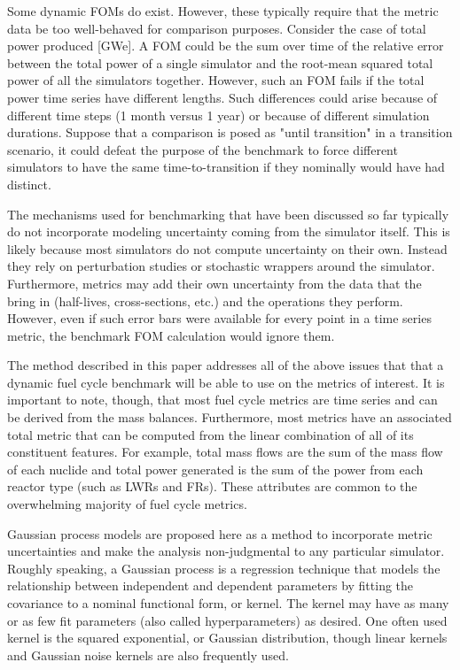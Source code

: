 Some dynamic FOMs do exist. However, these typically require that the metric
data be too well-behaved for comparison purposes. Consider the case of total
power produced [GWe]. A FOM could be the sum over time of the relative error 
between the total power of a single simulator and the root-mean squared total power
of all the simulators together. However, such an FOM fails if the total power
time series have different lengths. Such differences could arise because 
of different time steps (1 month versus 1 year) or because of different 
simulation durations. Suppose that a comparison is posed as "until transition"
in a transition scenario, it could defeat the purpose of the benchmark to
force different simulators to have the same time-to-transition if they 
nominally would have had distinct. 
 
The mechanisms used for benchmarking that have been discussed so far typically
do not incorporate modeling uncertainty coming from the simulator itself.
This is likely because most simulators do not compute uncertainty on their 
own. Instead they rely on perturbation studies or stochastic wrappers around 
the simulator. Furthermore, metrics may add their own uncertainty from the 
data that the bring in (half-lives, cross-sections, etc.) and the 
operations they perform. However, even if such error bars were available for
every point in a time series metric, the benchmark FOM calculation would 
ignore them.

The method described in this paper addresses all of the above issues that 
that a dynamic fuel cycle benchmark will be able to use on the 
metrics of interest. It is important to note, though, that most fuel cycle 
metrics are time series and can be derived from the mass balances. 
Furthermore, most metrics have an associated total metric that can be 
computed from the linear combination of all of its constituent features. 
For example, total mass flows are the sum of the mass flow of each nuclide
and total power generated is the sum of the power from each reactor type 
(such as LWRs and FRs).  These attributes are common to the overwhelming 
majority of fuel cycle metrics.

Gaussian process models are proposed here as a method to incorporate 
metric uncertainties and make the analysis non-judgmental to any particular 
simulator. Roughly speaking, a Gaussian process is a regression technique
that models the relationship between independent and dependent parameters
by fitting the covariance to a nominal functional form, or kernel.
The kernel may have as many or as few fit parameters (also called 
hyperparameters) as desired. One often used kernel is the squared 
exponential, or Gaussian distribution, though linear kernels and Gaussian
noise kernels are also frequently used. 

